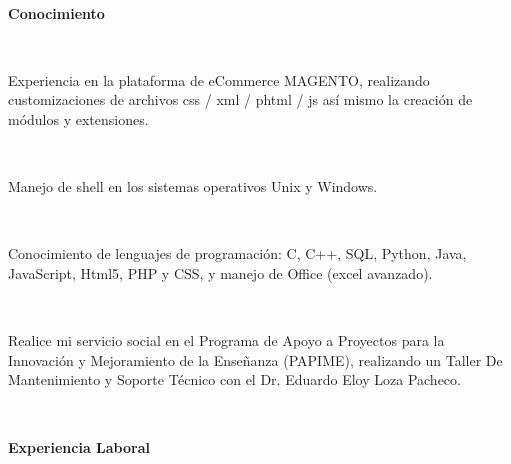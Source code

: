 \documentclass[10pt]{article}
\begin{document}

\ 

\begin{large}
\textbf{Conocimiento}
\end{large}

\ 

Experiencia en la plataforma de eCommerce MAGENTO, realizando customizaciones de archivos  css / xml / phtml / js así mismo la creación de módulos y extensiones.

\ 

Manejo de shell en los sistemas operativos Unix y Windows.

\ 

Conocimiento de lenguajes de programación: C, C++,  SQL, Python, Java, JavaScript, Html5, PHP y CSS, y manejo de Office (excel avanzado). 

\ 

Realice mi servicio social en el Programa de Apoyo a Proyectos para la Innovación y Mejoramiento de la Enseñanza (PAPIME), realizando un Taller De Mantenimiento y Soporte T\'ecnico %
con el Dr. Eduardo Eloy Loza Pacheco.


\ 

\begin{large}
\textbf{Experiencia Laboral}
\end{large}

\ 
\end{document}
